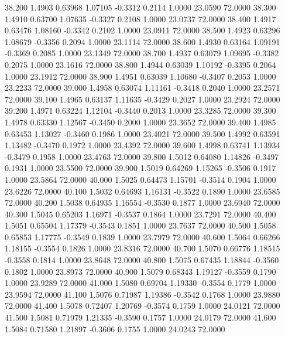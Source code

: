   38.200   1.4903   0.63968   1.07105  -0.3312   0.2114   1.0000  23.0590  72.0000
  38.300   1.4910   0.63700   1.07635  -0.3327   0.2108   1.0000  23.0737  72.0000
  38.400   1.4917   0.63476   1.08160  -0.3342   0.2102   1.0000  23.0911  72.0000
  38.500   1.4923   0.63296   1.08679  -0.3356   0.2094   1.0000  23.1114  72.0000
  38.600   1.4930   0.63164   1.09191  -0.3369   0.2085   1.0000  23.1349  72.0000
  38.700   1.4937   0.63079   1.09695  -0.3382   0.2075   1.0000  23.1616  72.0000
  38.800   1.4944   0.63039   1.10192  -0.3395   0.2064   1.0000  23.1912  72.0000
  38.900   1.4951   0.63039   1.10680  -0.3407   0.2053   1.0000  23.2233  72.0000
  39.000   1.4958   0.63074   1.11161  -0.3418   0.2040   1.0000  23.2571  72.0000
  39.100   1.4965   0.63137   1.11635  -0.3429   0.2027   1.0000  23.2924  72.0000
  39.200   1.4971   0.63224   1.12104  -0.3440   0.2013   1.0000  23.3285  72.0000
  39.300   1.4978   0.63330   1.12567  -0.3450   0.2000   1.0000  23.3652  72.0000
  39.400   1.4985   0.63453   1.13027  -0.3460   0.1986   1.0000  23.4021  72.0000
  39.500   1.4992   0.63591   1.13482  -0.3470   0.1972   1.0000  23.4392  72.0000
  39.600   1.4998   0.63741   1.13934  -0.3479   0.1958   1.0000  23.4763  72.0000
  39.800   1.5012   0.64080   1.14826  -0.3497   0.1931   1.0000  23.5500  72.0000
  39.900   1.5019   0.64269   1.15265  -0.3506   0.1917   1.0000  23.5864  72.0000
  40.000   1.5025   0.64473   1.15701  -0.3514   0.1904   1.0000  23.6226  72.0000
  40.100   1.5032   0.64693   1.16131  -0.3522   0.1890   1.0000  23.6585  72.0000
  40.200   1.5038   0.64935   1.16554  -0.3530   0.1877   1.0000  23.6940  72.0000
  40.300   1.5045   0.65203   1.16971  -0.3537   0.1864   1.0000  23.7291  72.0000
  40.400   1.5051   0.65504   1.17379  -0.3543   0.1851   1.0000  23.7637  72.0000
  40.500   1.5058   0.65853   1.17775  -0.3549   0.1839   1.0000  23.7979  72.0000
  40.600   1.5064   0.66266   1.18155  -0.3554   0.1826   1.0000  23.8316  72.0000
  40.700   1.5070   0.66776   1.18515  -0.3558   0.1814   1.0000  23.8648  72.0000
  40.800   1.5075   0.67435   1.18844  -0.3560   0.1802   1.0000  23.8973  72.0000
  40.900   1.5079   0.68343   1.19127  -0.3559   0.1790   1.0000  23.9289  72.0000
  41.000   1.5080   0.69704   1.19330  -0.3554   0.1779   1.0000  23.9594  72.0000
  41.100   1.5076   0.71987   1.19386  -0.3542   0.1768   1.0000  23.9880  72.0000
  41.400   1.5078   0.72407   1.20769  -0.3574   0.1759   1.0000  24.0121  72.0000
  41.500   1.5081   0.71979   1.21335  -0.3590   0.1757   1.0000  24.0179  72.0000
  41.600   1.5084   0.71580   1.21897  -0.3606   0.1755   1.0000  24.0243  72.0000
